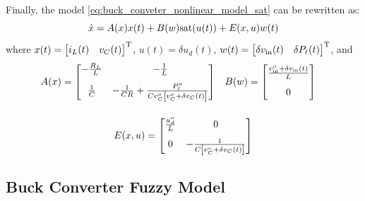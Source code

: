 Finally, the model \eqref{eq:buck_conveter_nonlinear_model_sat} can be rewritten as:
\begin{equation}
  \dot x = A(x) x(t) + B(w) {\rm sat}(u(t)) + E(x,u) w(t)
  \label{eq:buck_conveter_nonlinear_model_ssm}
\end{equation}
where $x(t) = \begin{bmatrix}i_L(t) & v_C(t)\end{bmatrix}^{\rm{T}}$, $u(t) = \delta u_d(t)$, $w(t) = \begin{bmatrix} \delta v_{\rm in}(t) & \delta P_{\ell}(t)\end{bmatrix}^{\rm{T}}$, and
\begin{gather}
  \notag
  \begin{align}
    A(x) & = \begin{bmatrix}
               - \frac{R_L}{L} & - \frac{1}{L}                                                                   \\[8pt]
               \frac{1}{C}     & - \frac{1}{C R} + \frac{P_{\ell}^o}{C v_C^o \left[v_C^o + \delta v_C(t)\right]}
             \end{bmatrix} &
    B(w) & = \begin{bmatrix}
               \frac{v_{\rm{in}}^{\rm o} +\delta v_{\rm{in}}(t)}{L} \\[8pt] 0
             \end{bmatrix}
  \end{align}
  \\[12pt]
  E(x,u) = \begin{bmatrix}
    \frac{u_d^{\rm o}}{L} & 0 \\[8pt] 0 &  - \frac{1}{C \left[v_C^{\rm o} + \delta v_C(t)\right] }
  \end{bmatrix}
  \label{eq:buck_conveter_nonlinear_model_ssm_e}
\end{gather}

\subsection{Buck Converter Fuzzy Model}

